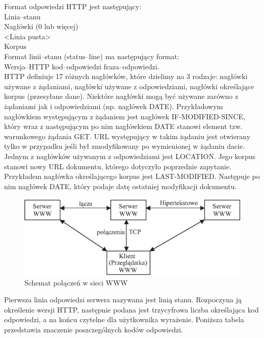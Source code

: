 Format odpowiedzi HTTP jest następujący:\\

	Linia--stanu\\
	Nagłówki (0 lub więcej)\\
	<Linia pusta>\\
	Korpus\\

Format linii--stanu (status--line) ma następujący format:\\

	Wersja--HTTP kod--odpowiedzi fraza--odpowiedzi.\\

HTTP definiuje 17 różnych nagłówków, które dzielimy na 3 rodzaje: nagłówki używane z żądaniami, nagłówki używane 
z odpowiedziami, nagłówki określające korpus (przesyłane dane). Niektóre nagłówki mogą być używane zarówno z 
żądaniami jak i odpowiedziami (np. nagłówek DATE). Przykładowym nagłówkiem występującym z żądaniem jest nagłówek 
IF-MODIFIED-SINCE, który wraz z następującym po nim nagłówkiem DATE stanowi element tzw. warunkowego żądania 
GET. URL występujący w takim żądaniu jest otwierany tylko w przypadku jeśli był zmodyfikowany po wymienionej w 
żądaniu dacie. Jednym z nagłówków używanym z odpowiedziami jest LOCATION. Jego korpus stanowi nowy URL 
dokumentu, którego dotyczyło poprzednie zapytanie. Przykładem nagłówka określającego korpus jest LAST-MODIFIED. 
Następuje po nim nagłówek DATE, który podaje datę ostatniej modyfikacji dokumentu.
\begin{figure}[h]
\centering
\includegraphics[width=5in]{./rysunki/polaczenia_w_sieci_www.eps}
\caption{Schemat połączeń w sieci WWW}
\label{polaczenia_www}
\end{figure}

Pierwsza linia odpowiedzi serwera nazywana jest linią stanu. Rozpoczyna ją określenie wersji HTTP, następnie 
podana jest trzycyfrowa liczba określająca kod odpowiedzi, a na końcu czytelne dla użytkownika wyrażenie. 
Poniższa tabela przedstawia znaczenie poszczególnych kodów odpowiedzi.

